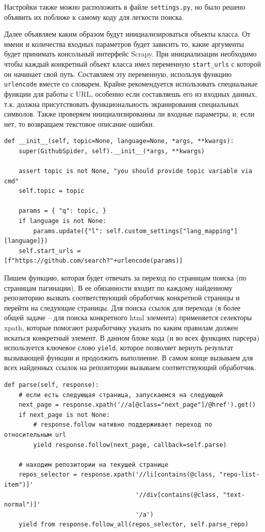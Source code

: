 Настройки также можно расположить в файле \verb|settings.py|, но было решено
объявить их поближе к самому коду для легкости поиска.

Далее объявляем каким образом будут инициализироваться объекты класса. От имени
и количества входных параметров будет зависить то, какие аргументы будет
принимать консольный интерфейс Scrapy. При инициализации необходимо чтобы каждый
конкретный объект класса имел переменную \verb|start_urls| с которой он начинает
свой путь. Составляем эту переменную, используя функцию \verb|urlencode| вместе
со словарем. Крайне рекомендуется использовать специальные функции для работы с
URL, особенно если составляешь его из входных данных, т.к. должна присутствовать
функциональность экранирования специальных символов. Также проверяем
инициализированны ли входные параметры, и, если нет, то возвращаем текстовое
описание ошибки.
\begin{verbatim}
def __init__(self, topic=None, language=None, *args, **kwargs):
    super(GithubSpider, self).__init__(*args, **kwargs)

    assert topic is not None, "you should provide topic variable via cmd"
    self.topic = topic

    params = { "q": topic, }
    if language is not None:
        params.update({"l": self.custom_settings["lang_mapping"][language]})
    self.start_urls = [f"https://github.com/search?"+urlencode(params)]
\end{verbatim}

Пишем функцию, которая будет отвечать за переход по страницам поиска (по
страницам пагинации). В ее обязанности входит по каждому найденному репозиторию
вызвать соответствующий обработчик конкретной страницы и перейти на следующие
страницы. Для поиска ссылок для перехода (в более общей задаче -- для поиска
конкретного html элемента) применяется селекторы xpath, которые помогают
разработчику указать по каким правилам должен искаться конкретный элемент. В
данном блоке кода (и во всех функциях парсера) используется ключевое слово
\verb|yield|, которое позволяет вернуть результат вызывающей функции и
продолжить выполнение. В самом конце вызываем для всех найденных ссылок на
репозитории вызываем соответствующий обработчик.
\begin{verbatim}
def parse(self, response):
    # если есть следующая страница, запускаемся на следующей
    next_page = response.xpath('//a[@class="next_page"]/@href').get()
    if next_page is not None:
        # response.follow нативно поддерживает переход по относительным url
        yield response.follow(next_page, callback=self.parse)

    # находим репозитории на текущей странице
    repos_selector = response.xpath('//li[contains(@class, "repo-list-item")]'
                                    '//div[contains(@class, "text-normal")]'
                                    '/a')
    yield from response.follow_all(repos_selector, self.parse_repo)
\end{verbatim}

